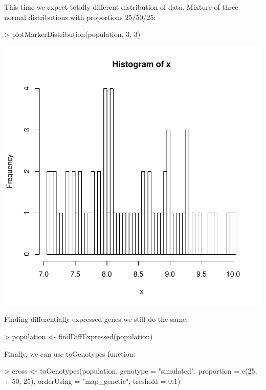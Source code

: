 \documentclass{article}
\begin{document}
{\noindent}This time we expect totally different distribution of data. Mixture of three normal distributions with proportions 25/50/25:
\begin{Schunk}
\begin{Sinput}
> plotMarkerDistribution(population, 3, 3)
\end{Sinput}
\end{Schunk}
\includegraphics{manual-021}

{\noindent}Finding differentially expressed genes we still do the same:
\begin{Schunk}
\begin{Sinput}
> population <- findDiffExpressed(population)
\end{Sinput}
\end{Schunk}

\newpage
{\noindent}Finally, we can use toGenotypes function:
\begin{Schunk}
\begin{Sinput}
> cross <- toGenotypes(population, genotype = "simulated", proportion = c(25, 
+     50, 25), orderUsing = "map_genetic", treshold = 0.1)
\end{Sinput}
\end{Schunk}
\end{document}
